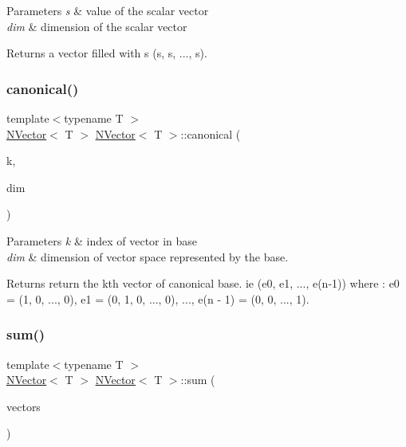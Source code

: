 \begin{DoxyParams}{Parameters}
{\em s} & value of the scalar vector \\
\hline
{\em dim} & dimension of the scalar vector \\
\hline
\end{DoxyParams}
\begin{DoxyReturn}{Returns}
a vector filled with s (s, s, ..., s). 
\end{DoxyReturn}
\mbox{\label{class_n_vector_a37b19eb888023546363e952cd39ea3a1}} 
\subsubsection{\texorpdfstring{canonical()}{canonical()}}
{\footnotesize\ttfamily template$<$typename T $>$ \\
\mbox{\hyperlink{class_n_vector}{N\+Vector}}$<$ T $>$ \mbox{\hyperlink{class_n_vector}{N\+Vector}}$<$ T $>$\+::canonical (\begin{DoxyParamCaption}\item[{\mbox{\hyperlink{typedef_8h_a1b140a2034db3f5dfe18a987745df43a}{ul\+\_\+t}}}]{k,  }\item[{\mbox{\hyperlink{typedef_8h_a1b140a2034db3f5dfe18a987745df43a}{ul\+\_\+t}}}]{dim }\end{DoxyParamCaption})\hspace{0.3cm}{\ttfamily [static]}}


\begin{DoxyParams}{Parameters}
{\em k} & index of vector in base \\
\hline
{\em dim} & dimension of vector space represented by the base. \\
\hline
\end{DoxyParams}
\begin{DoxyReturn}{Returns}
return the kth vector of canonical base. ie (e0, e1, ..., e(n-\/1)) where \+: e0 = (1, 0, ..., 0), e1 = (0, 1, 0, ..., 0), ..., e(n -\/ 1) = (0, 0, ..., 1). 
\end{DoxyReturn}
\mbox{\label{class_n_vector_af0f5749405554fc23a0af67ad4f9e9e5}} 
\subsubsection{\texorpdfstring{sum()}{sum()}}
{\footnotesize\ttfamily template$<$typename T $>$ \\
\mbox{\hyperlink{class_n_vector}{N\+Vector}}$<$ T $>$ \mbox{\hyperlink{class_n_vector}{N\+Vector}}$<$ T $>$\+::sum (\begin{DoxyParamCaption}\item[{const std\+::vector$<$ \mbox{\hyperlink{class_n_vector}{N\+Vector}}$<$ T $>$ $>$ \&}]{vectors }\end{DoxyParamCaption})\hspace{0.3cm}{\ttfamily [static]}}


